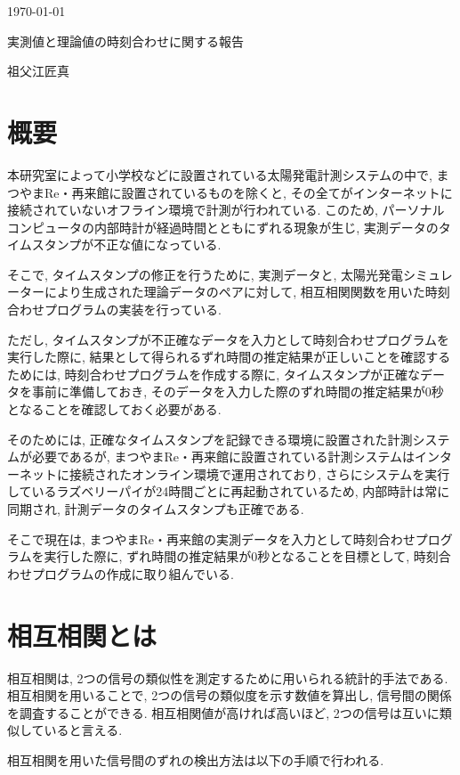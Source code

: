 \documentclass[a4j,12pt,]{jarticle}
\begin{document}
{\noindent\small  \hfill\today}
\begin{center}
  {\Large 実測値と理論値の時刻合わせに関する報告}
\end{center}
\begin{flushright}
  祖父江匠真 \\
\end{flushright}

\section{概要}
本研究室によって小学校などに設置されている太陽発電計測システムの中で, まつやまRe・再来館に設置されているものを除くと, その全てがインターネットに接続されていないオフライン環境で計測が行われている. このため, パーソナルコンピュータの内部時計が経過時間とともにずれる現象が生じ, 実測データのタイムスタンプが不正な値になっている.

そこで, タイムスタンプの修正を行うために, 実測データと, 太陽光発電シミュレーターにより生成された理論データのペアに対して, 相互相関関数を用いた時刻合わせプログラムの実装を行っている.

ただし, タイムスタンプが不正確なデータを入力として時刻合わせプログラムを実行した際に, 結果として得られるずれ時間の推定結果が正しいことを確認するためには, 時刻合わせプログラムを作成する際に, タイムスタンプが正確なデータを事前に準備しておき, そのデータを入力した際のずれ時間の推定結果が0秒となることを確認しておく必要がある.

そのためには, 正確なタイムスタンプを記録できる環境に設置された計測システムが必要であるが, まつやまRe・再来館に設置されている計測システムはインターネットに接続されたオンライン環境で運用されており, さらにシステムを実行しているラズベリーパイが24時間ごとに再起動されているため, 内部時計は常に同期され, 計測データのタイムスタンプも正確である.

そこで現在は, まつやまRe・再来館の実測データを入力として時刻合わせプログラムを実行した際に, ずれ時間の推定結果が0秒となることを目標として, 時刻合わせプログラムの作成に取り組んでいる.

\section{相互相関とは}
相互相関は, 2つの信号の類似性を測定するために用いられる統計的手法である. 相互相関を用いることで, 2つの信号の類似度を示す数値を算出し, 信号間の関係を調査することができる. 相互相関値が高ければ高いほど, 2つの信号は互いに類似していると言える.

相互相関を用いた信号間のずれの検出方法は以下の手順で行われる.
\end{document}
